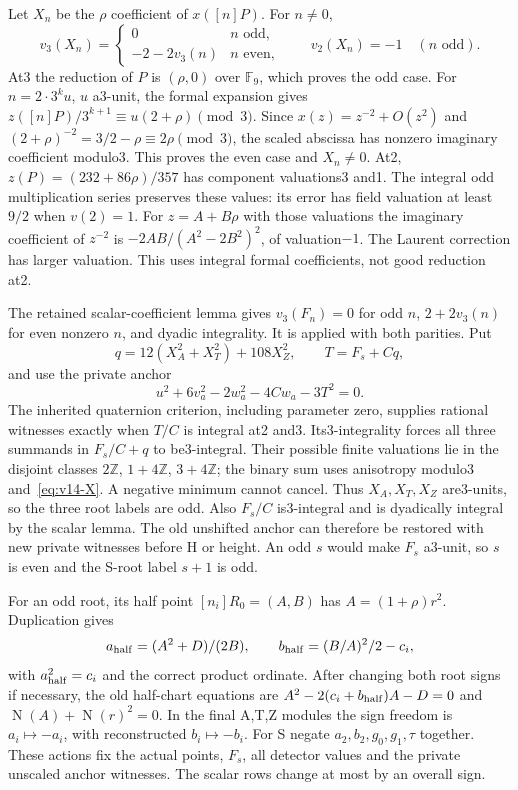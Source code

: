 Let $X_n$ be the $\rho$ coefficient of $x([n]P)$. For $n\ne0$,
\begin{equation}\label{eq:v14-X}
 v_3(X_n)=
 \begin{cases}0&n\text{ odd},\\-2-2v_3(n)&n\text{ even},\end{cases}
 \qquad v_2(X_n)=-1\quad(n\text{ odd}).
\end{equation}
At3 the reduction of $P$ is $(\rho,0)$ over $\mathbb F_9$,
which proves the odd case. For $n=2\cdot3^ku$, $u$ a3-unit,
the formal expansion gives
$z([n]P)/3^{k+1}\equiv u(2+\rho)\pmod3$.
Since $x(z)=z^{-2}+O(z^2)$ and
$(2+\rho)^{-2}=3/2-\rho\equiv2\rho\pmod3$, the scaled
abscissa has nonzero imaginary coefficient modulo3. This proves
the even case and $X_n\ne0$.
At2, $z(P)=(232+86\rho)/357$ has component valuations3 and1.
The integral odd multiplication series preserves these values:
its error has field valuation at least$9/2$ when $v(2)=1$.
For $z=A+B\rho$ with those valuations the imaginary coefficient
of $z^{-2}$ is $-2AB/(A^2-2B^2)^2$, of valuation$-1$.
The Laurent correction has larger valuation. This uses integral
formal coefficients, not good reduction at2.

The retained scalar-coefficient lemma gives $v_3(F_n)=0$ for odd
$n$, $2+2v_3(n)$ for even nonzero $n$, and dyadic integrality.
It is applied with both parities. Put
\begin{equation}\label{eq:v14-q}
 q=12(X_A^2+X_T^2)+108X_Z^2,\qquad T=F_s+Cq,
\end{equation}
and use the private anchor
\begin{equation}\label{eq:v14-anchor}
 u^2+6v_a^2-2w_a^2-4Cw_a-3T^2=0.
\end{equation}
The inherited quaternion criterion, including parameter zero,
supplies rational witnesses exactly when $T/C$ is integral at2
and3. Its3-integrality forces all three summands in $F_s/C+q$
to be3-integral. Their possible finite valuations lie in the
disjoint classes $2\mathbb Z$, $1+4\mathbb Z$, $3+4\mathbb Z$;
the binary sum uses anisotropy modulo3 and~\eqref{eq:v14-X}.
A negative minimum cannot cancel. Thus $X_A,X_T,X_Z$ are3-units,
so the three root labels are odd. Also $F_s/C$ is3-integral
and is dyadically integral by the scalar lemma. The old unshifted
anchor can therefore be restored with new private witnesses
before H or height. An odd $s$ would make $F_s$ a3-unit,
so $s$ is even and the S-root label $s+1$ is odd.

For an odd root, its half point $[n_i]R_0=(A,B)$ has
$A=(1+\rho)r^2$. Duplication gives
\[
 a_{\rm half}=(A^2+D)/(2B),\qquad
 b_{\rm half}=(B/A)^2/2-c_i,
\]
with $a_{\rm half}^2=c_i$ and the correct product ordinate.
After changing both root signs if necessary, the old half-chart
equations are
$A^2-2(c_i+b_{\rm half})A-D=0$ and
$\operatorname N(A)+\operatorname N(r)^2=0$.
In the final A,T,Z modules the sign freedom is $a_i\mapsto-a_i$,
with reconstructed $b_i\mapsto-b_i$. For S negate
$a_2,b_2,g_0,g_1,\tau$ together. These actions fix the actual
points, $F_s$, all detector values and the private unscaled anchor
witnesses. The scalar rows change at most by an overall sign.

